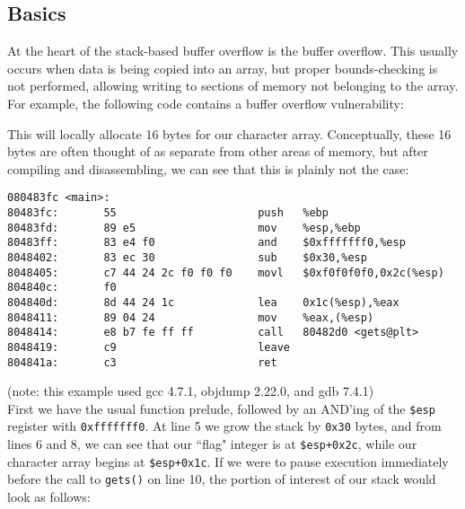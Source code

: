 \subsection{Basics}
At the heart of the stack-based buffer overflow is the buffer overflow. This usually 
occurs when data is being copied into an array, but proper bounds-checking is not performed,
allowing writing to sections of memory not belonging to the array. For example, the
following code contains a buffer overflow vulnerability:

This will locally allocate 16 bytes for our character array. Conceptually, these 16 bytes
are often thought of as separate from other areas of memory, but after compiling and disassembling,
we can see that this is plainly not the case:
\begin{lstlisting}
080483fc <main>:
80483fc:       55                      push   %ebp
80483fd:       89 e5                   mov    %esp,%ebp
80483ff:       83 e4 f0                and    $0xfffffff0,%esp
8048402:       83 ec 30                sub    $0x30,%esp
8048405:       c7 44 24 2c f0 f0 f0    movl   $0xf0f0f0f0,0x2c(%esp)
804840c:       f0 
804840d:       8d 44 24 1c             lea    0x1c(%esp),%eax
8048411:       89 04 24                mov    %eax,(%esp)
8048414:       e8 b7 fe ff ff          call   80482d0 <gets@plt>
8048419:       c9                      leave  
804841a:       c3                      ret    
\end{lstlisting}

\small{(note: this example used gcc 4.7.1, objdump 2.22.0, and gdb 7.4.1)}\normalsize\\

First we have the usual function prelude, followed by an AND'ing of the \texttt{\$esp} register with \texttt{0xfffffff0}.
At line 5 we grow the stack by \texttt{0x30} bytes, and from lines 6 and 8, we can see that our ``flag" integer
is at \texttt{\$esp+0x2c}, while our character array begins at \texttt{\$esp+0x1c}. If we were to pause execution
immediately before the call to \texttt{gets()} on line 10, the portion of interest of our stack would look as follows:


